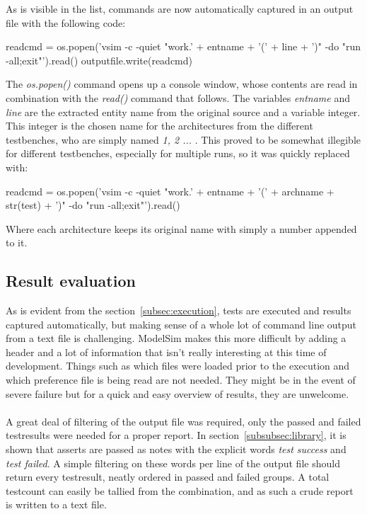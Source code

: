 \documentclass[11pt,british]{article}
\begin{document}
\noindent As is visible in the list, commands are now automatically captured in an output file with the following code:
\begin{python}
readcmd = os.popen('vsim -c -quiet "work.' + entname 
					+ '(' + line 
					+ ')"	-do "run -all;exit"').read()
outputfile.write(readcmd)
\end{python}
The \emph{os.popen()} command opens up a console window, whose contents are read in combination with the \emph{read()} command that follows. The variables \emph{entname} and \emph{line} are the extracted entity name from the original source and a variable integer. This integer is the chosen name for the architectures from the different testbenches, who are simply named \emph{1, 2 ...} . This proved to be somewhat illegible for different testbenches, especially for multiple runs, so it was quickly replaced with:
\begin{python}
readcmd = os.popen('vsim -c -quiet "work.' + entname 
					+ '(' + archname + str(test) 
					+ ')" -do "run -all;exit"').read()
\end{python}
Where each architecture keeps its original name with simply a number appended to it.

\subsection{Result evaluation}
As is evident from the section~\ref{subsec:execution}, tests are executed and results captured automatically, but making sense of a whole lot of command line output from a text file is challenging. ModelSim makes this more difficult by adding a header and a lot of information that isn't really interesting at this time of development. Things such as which files were loaded prior to the execution and which preference file is being read are not needed. They might be in the event of severe failure but for a quick and easy overview of results, they are unwelcome.\\
\\
A great deal of filtering of the output file was required, only the passed and failed testresults were needed for a proper report. In section~\ref{subsubsec:library}, it is shown that asserts are passed as notes with the explicit words \emph{test success} and \emph{test failed}. A simple filtering on these words per line of the output file should return every testresult, neatly ordered in passed and failed groups. A total testcount can easily be tallied from the combination, and as such a crude report is written to a text file.
\end{document}
